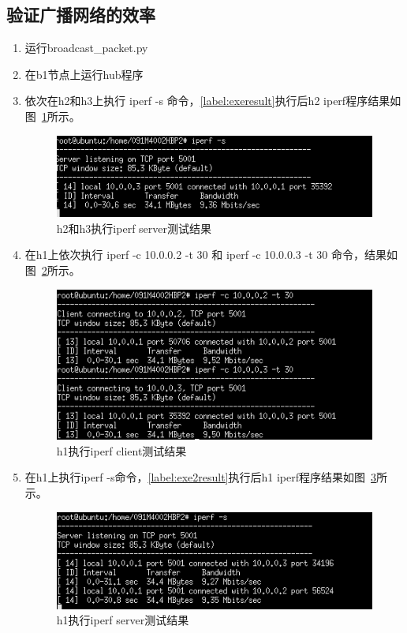 \documentclass{zjureport}
\begin{document}
  \subsection{验证广播网络的效率}
  \begin{enumerate}
      \item 运行broadcast\_packet.py
      \item 在b1节点上运行hub程序
      \item 依次在h2和h3上执行 iperf -s 命令，\ref{label:exeresult}执行后h2 iperf程序结果如图~\ref{fig:08}所示。
        \begin{figure}[!htbp]
          \centering
          \includegraphics[width=0.7\linewidth]{figures/08.jpg}
          \caption{h2和h3执行iperf server测试结果}
          \label{fig:08}
        \end{figure}

      \item \label{label:exeresult} 在h1上依次执行 iperf -c 10.0.0.2 -t 30 和 iperf -c 10.0.0.3 -t 30 命令，结果如图~\ref{fig:09}所示。
        \begin{figure}[!htbp]
          \centering
          \includegraphics[width=0.7\linewidth]{figures/09.jpg}
          \caption{h1执行iperf client测试结果}
          \label{fig:09}
        \end{figure}

      \item 在h1上执行iperf -s命令，\ref{label:exe2result}执行后h1 iperf程序结果如图~\ref{fig:10}所示。
        \begin{figure}[!htbp]
          \centering
          \includegraphics[width=0.7\linewidth]{figures/10.jpg}
          \caption{h1执行iperf server测试结果}
          \label{fig:10}
        \end{figure}


\end{enumerate}
\end{document}
